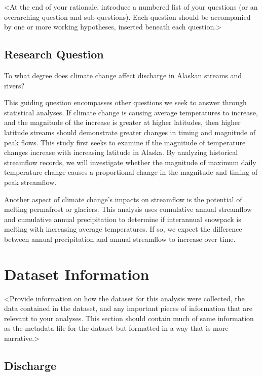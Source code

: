 \documentclass[12pt,]{article}
\begin{document}
\textless{}At the end of your rationale, introduce a numbered list of
your questions (or an overarching question and sub-questions). Each
question should be accompanied by one or more working hypotheses,
inserted beneath each question.\textgreater{}

\hypertarget{research-question}{%
\subsection{Research Question}\label{research-question}}

To what degree does climate change affect discharge in Alaskan streams
and rivers?

This guiding question encompasses other questions we seek to answer
through statistical analyses. If climate change is causing average
temperatures to increase, and the magnitude of the increase is greater
at higher latitudes, then higher latitude streams should demonstrate
greater changes in timing and magnitude of peak flows. This study first
seeks to examine if the magnitude of temperature changes increase with
increasing latitude in Alaska. By analyzing historical streamflow
records, we will investigate whether the magnitude of maximum daily
temperature change causes a proportional change in the magnitude and
timing of peak streamflow.

Another aspect of climate change's impacts on streamflow is the
potential of melting permafrost or glaciers. This analysis uses
cumulative annual streamflow and cumulative annual precipitation to
determine if interannual snowpack is melting with increasing average
temperatures. If so, we expect the difference between annual
precipitation and annual streamflow to increase over time.

\newpage

\hypertarget{dataset-information}{%
\section{Dataset Information}\label{dataset-information}}

\textless{}Provide information on how the dataset for this analysis were
collected, the data contained in the dataset, and any important pieces
of information that are relevant to your analyses. This section should
contain much of same information as the metadata file for the dataset
but formatted in a way that is more narrative.\textgreater{}

\hypertarget{discharge}{%
\subsection{Discharge}\label{discharge}}
\end{document}
